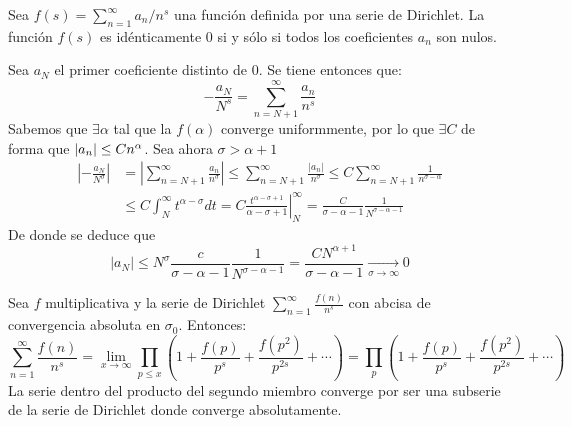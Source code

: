 \documentclass[TAN.tex]{subfiles}
\begin{document}
\begin{prop} Sea $f(s) = \sum_{n=1}^\infty a_n/n^s$ una función definida por una serie de Dirichlet. La función $f(s)$ es idénticamente $0$ si y sólo si todos los coeficientes $a_n$ son nulos.
\end{prop}
\begin{dem}
Sea $a_N$ el primer coeficiente distinto de 0. Se tiene entonces que:
\[ -\frac{a_N}{N^s} = \sum_{n=N+1}^{∞} \frac{a_n}{n^s} \]
 Sabemos que $\exists \alpha$ tal que la $f(\alpha)$ converge uniformmente, por lo que $\exists C$ de forma que $\left|a_n\right|\leq C n^{\alpha}$. Sea ahora $\sigma >\alpha+1$
\begin{align*}
 \left|-\frac{a_N}{N^σ}\right| &= \left|\sum_{n=N+1}^{∞} \frac{a_n}{n^σ}\right| ≤ \sum_{n=N+1}^{∞} \frac{|a_n|}{n^σ}≤ C \sum_{n=N+1}^{∞} \frac{1}{n^{σ-α}} \\
 &≤ C \int_N^{∞} t^{α-σ} dt = C \left.\frac{t^{α-σ+1}}{α-σ+1}\right|_N^{∞} = \frac{C}{σ-α-1} \frac{1}{N^{σ-α-1}}
\end{align*}
De donde se deduce que
\[ |a_N| ≤ N^σ \frac{c}{σ-α-1} \frac{1}{N^{σ-α-1}} = \frac{CN^{α+1}}{σ-α-1} \underset{\sigma\to \infty}{\longrightarrow} 0\]
\end{dem}

\begin{prop} Sea $f$ multiplicativa y la serie de Dirichlet $\sum_{n=1}^\infty \frac{f(n)}{n^s}$ con abcisa de convergencia absoluta en $σ_0$. Entonces:
\[ \sum_{n=1}^\infty \frac{f(n)}{n^s} = \lim_{x \to \infty} \prod_{p≤x} \left(1+\frac{f(p)}{p^s} + \frac{f(p^2)}{p^{2s}}+\cdots\right) = \prod_{p} \left(1+\frac{f(p)}{p^s} + \frac{f(p^2)}{p^{2s}}+\cdots\right) \]
La serie dentro del producto del segundo miembro converge por ser una subserie de la serie de Dirichlet donde converge absolutamente. 
\end{prop}
\end{document}
